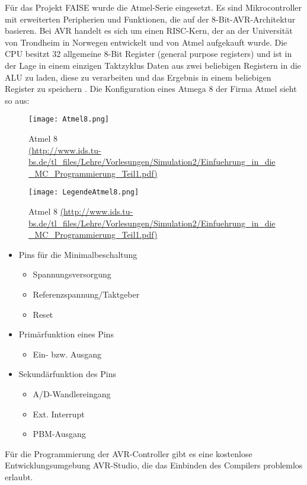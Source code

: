 F\"ur das Projekt FAISE wurde die Atmel-Serie eingesetzt. Es sind Mikrocontroller mit erweiterten Peripherien und Funktionen, 
die auf der 8-Bit-AVR-Architektur basieren. Bei AVR handelt es sich um einen RISC-Kern, der an der Universit\"at von Trondheim 
in Norwegen entwickelt und von Atmel aufgekauft wurde. Die CPU besitzt 32 allgemeine 8-Bit Register (general purpose registers) 
und ist in der Lage in einem einzigen Taktzyklus Daten aus zwei beliebigen Registern in die ALU zu laden, diese zu verarbeiten 
und das Ergebnis in einem beliebigen Register zu speichern \cite[vgl.]{Viktor:Seib:2014:Online}. Die Konfiguration eines Atmega 8 der Firma Atmel sieht so aus:
\begin{figure}[h!]
	\centering
		\texttt{[image: Atmel8.png]}
	\caption{Atmel 8 \\ \url{(http://www.ids.tu-bs.de/tl\_files/Lehre/Vorlesungen/Simulation2/Einfuehrung\_in\_die\_MC\_Programmierung\_Teil1.pdf)}}
	\label{Atmel 8}
\end{figure}
\begin{figure}[h!]
	\centering
		\texttt{[image: LegendeAtmel8.png]}
	\caption{Atmel 8 \url{(http://www.ids.tu-bs.de/tl\_files/Lehre/Vorlesungen/Simulation2/Einfuehrung\_in\_die\_MC\_Programmierung\_Teil1.pdf)}}
	\label{Legende Atmel8}
\end{figure}
\begin{itemize}
\item Pins f\"ur die Minimalbeschaltung
\begin{itemize}
          \item Spannungsversorgung
          \item Referenzspannung/Taktgeber
          \item Reset      
					\end{itemize}
\item Prim\"arfunktion eines Pins
\begin{itemize}
          \item Ein- bzw. Ausgang
					\end{itemize}
\item Sekund\"arfunktion des Pins
\begin{itemize}
          \item A/D-Wandlereingang
          \item Ext. Interrupt
          \item PBM-Ausgang   
\end{itemize}
\end{itemize}
F\"ur die Programmierung der AVR-Controller gibt es eine kostenlose Entwicklungsumgebung AVR-Studio, die das Einbinden des Compilers problemlos erlaubt.

